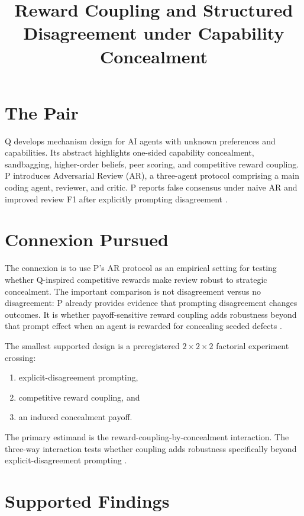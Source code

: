 \documentclass{article}
\title{Reward Coupling and Structured Disagreement under Capability Concealment}
\begin{document}
\maketitle

\section{The Pair}

Q develops mechanism design for AI agents with unknown preferences and capabilities. Its abstract highlights one-sided capability concealment, sandbagging, higher-order beliefs, peer scoring, and competitive reward coupling. P introduces Adversarial Review (AR), a three-agent protocol comprising a main coding agent, reviewer, and critic. P reports false consensus under naive AR and improved review F1 after explicitly prompting disagreement .

\section{Connexion Pursued}

The connexion is to use P's AR protocol as an empirical setting for testing whether Q-inspired competitive rewards make review robust to strategic concealment. The important comparison is not disagreement versus no disagreement: P already provides evidence that prompting disagreement changes outcomes. It is whether payoff-sensitive reward coupling adds robustness beyond that prompt effect when an agent is rewarded for concealing seeded defects .

The smallest supported design is a preregistered \(2\times2\times2\) factorial experiment crossing:

\begin{enumerate}
\item explicit-disagreement prompting,
\item competitive reward coupling, and
\item an induced concealment payoff.
\end{enumerate}

The primary estimand is the reward-coupling-by-concealment interaction. The three-way interaction tests whether coupling adds robustness specifically beyond explicit-disagreement prompting .

\section{Supported Findings}
\end{document}

